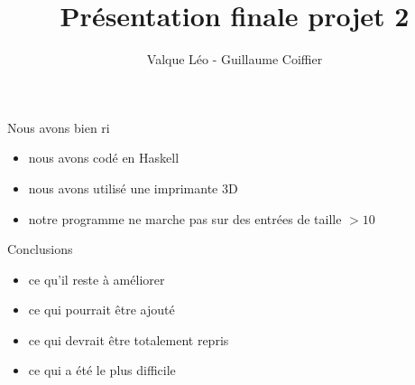 \documentclass{beamer}
\title{Présentation finale projet 2}
\author{Valque Léo - Guillaume Coiffier}
\institute{ENS de Lyon}
\date{}
\begin{document}
\maketitle

\begin{frame}{Nous avons bien ri}

  \begin{itemize}
  \item nous avons codé en Haskell

  \item nous avons utilisé une imprimante 3D

    \pause


  \item notre programme ne marche pas sur des entrées de taille $>10$

  \end{itemize}
  
\end{frame}

\begin{frame}{Conclusions}

  \begin{itemize}
  \item ce qu'il reste à améliorer

  \item ce qui pourrait être ajouté

  \item ce qui devrait être totalement repris

  \item ce qui a été le plus difficile
  \end{itemize}
  
\end{frame}
\end{document}
